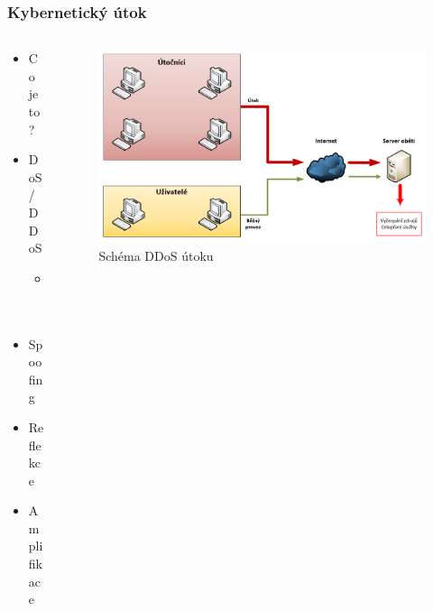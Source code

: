 \documentclass[%
12pt,       				%
t,                  %
aspectratio=1610,   %
unicode,						%
czech,              %
]{beamer}				    	%
\begin{document}
\begin{frame}
\frametitle{Kybernetický útok}
\begin{columns}[T] 								%
	\begin{column}{0.3\textwidth}		%
		\begin{itemize}
			\item Co je to?
			\item DoS/DDoS
			\begin{itemize}
				\item C\&C
			\end{itemize}
			\item Spoofing
			\item Reflekce
			\item Amplifikace
		\end{itemize}
	\end{column}
	\begin{column}{0.7\textwidth}
		\begin{figure}%
			\centering
			\vspace{0.1cm}	              %
			\includegraphics[width=0.99\columnwidth]{obrazky/ddos_schema.png}
			\caption{Schéma DDoS útoku}
		\end{figure}
	\end{column}
\end{columns}											%
\end{frame}

\end{document}
